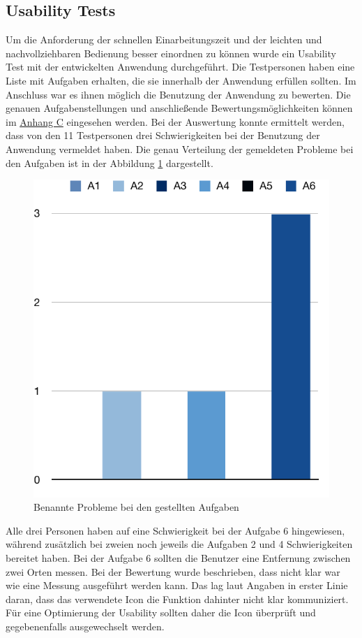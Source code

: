 \subsection{Usability Tests}
Um die Anforderung der schnellen Einarbeitungszeit und der leichten und nachvollziehbaren Bedienung besser einordnen zu können wurde ein Usability Test mit der entwickelten Anwendung durchgeführt.
Die Testpersonen haben eine Liste mit Aufgaben erhalten, die sie innerhalb der Anwendung erfüllen sollten.
Im Anschluss war es ihnen möglich die Benutzung der Anwendung zu bewerten.
Die genauen Aufgabenstellungen und anschließende Bewertungsmöglichkeiten können im \hyperref[sec:appendixc]{Anhang C} eingesehen werden.\pbreak%
%
Bei der Auswertung konnte ermittelt werden, dass von den 11 Testpersonen drei Schwierigkeiten bei der Benutzung der Anwendung vermeldet haben.
Die genau Verteilung der gemeldeten Probleme bei den Aufgaben ist in der Abbildung \ref{fig:usability-column} dargestellt.
\begin{figure}[h]
	\centering
	\vspace{15pt}
	\includegraphics[scale=0.8]{images/usability-results-column.pdf}
	\caption{Benannte Probleme bei den gestellten Aufgaben}
	\label{fig:usability-column}
\end{figure}
Alle drei Personen haben auf eine Schwierigkeit bei der Aufgabe 6 hingewiesen, während zusätzlich bei zweien noch jeweils die Aufgaben 2 und 4 Schwierigkeiten bereitet haben.
Bei der Aufgabe 6 sollten die Benutzer eine Entfernung zwischen zwei Orten messen.
Bei der Bewertung wurde beschrieben, dass nicht klar war wie eine Messung ausgeführt werden kann.
Das lag laut Angaben in erster Linie daran, dass das verwendete Icon die Funktion dahinter nicht klar kommuniziert.
Für eine Optimierung der Usability sollten daher die Icon überprüft und gegebenenfalls ausgewechselt werden.
